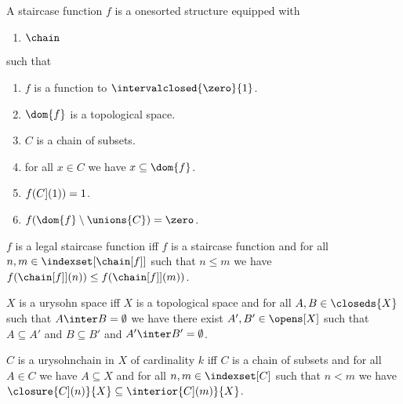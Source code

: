 \begin{struct}\label{staircase_function}
    A staircase function $f$ is a onesorted structure equipped with
    \begin{enumerate}
        \item $\chain$
    \end{enumerate}
    such that
    \begin{enumerate}
        \item \label{staircase_is_function} $f$ is a function to $\intervalclosed{\zero}{1}$.
        \item \label{staircase_domain} $\dom{f}$ is a topological space.
        \item \label{staricase_def_chain} $C$ is a chain of subsets.
        \item \label{staircase_chain_is_in_domain} for all $x \in C$ we have $x \subseteq \dom{f}$.
        \item \label{staircase_behavoir_index_zero} $f(\index[C](1))= 1$. 
        \item \label{staircase_behavoir_index_n} $f(\dom{f}\setminus \unions{C}) = \zero$.
    \end{enumerate}
\end{struct}

\begin{definition}\label{legal_staircase}
    $f$ is a legal staircase function iff
    $f$ is a staircase function and 
    for all $n,m \in \indexset[\chain[f]]$ such that $n \leq m$ we have $f(\index[\chain[f]](n)) \leq f(\index[\chain[f]](m))$.
\end{definition}

\begin{abbreviation}\label{urysohnspace}
    $X$ is a urysohn space iff
    $X$ is a topological space and
    for all $A,B \in \closeds{X}$ such that $A \inter B = \emptyset$
    we have there exist $A',B' \in \opens[X]$
    such that  $A \subseteq A'$ and $B \subseteq B'$ and $A' \inter B' = \emptyset$.    
\end{abbreviation}

\begin{definition}\label{urysohnchain}
    $C$ is a urysohnchain in $X$ of cardinality $k$ iff %
    $C$ is a chain of subsets and
    for all $A \in C$ we have $A \subseteq X$ and
    for all $n,m \in \indexset[C]$ such that $n < m$ we have $\closure{\index[C](n)}{X} \subseteq \interior{\index[C](m)}{X}$.
\end{definition}

